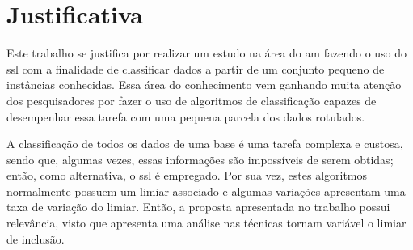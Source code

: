 \section{Justificativa}
    \label{sec:justificativa}
    Este trabalho se justifica por realizar um estudo na área do \ac{am} fazendo o uso do \ac{ssl} com a finalidade de classificar dados a partir de um conjunto pequeno de instâncias conhecidas. Essa área do conhecimento vem ganhando muita atenção dos pesquisadores por fazer o uso de algoritmos de classificação capazes de desempenhar essa tarefa com uma pequena parcela dos dados rotulados.
    
    
    A classificação de todos os dados de uma base é uma tarefa complexa e custosa, sendo que, algumas vezes, essas informações são impossíveis de serem obtidas; então, como alternativa, o \ac{ssl} é empregado. Por sua vez, estes algoritmos normalmente possuem um limiar associado e algumas variações apresentam uma taxa de variação do limiar. Então, a proposta apresentada no trabalho possui relevância, visto que apresenta uma análise nas técnicas tornam variável o limiar de inclusão.
